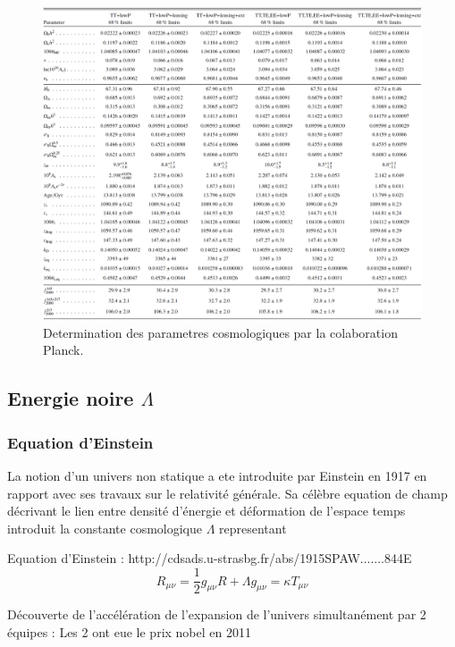 \begin{figure}[bth]
        \includegraphics[width=.95\linewidth]{img/01/table_planck.pdf} 
        \caption{Determination des parametres cosmologiques par la colaboration Planck.}
 		\label{fig:planck_parameters}
\end{figure}

\citep{planck_collaboration_planck_2016}

\subsection{Energie noire $\Lambda$}

\subsubsection{Equation d'Einstein}

La notion d'un univers non statique a ete introduite par Einstein en 1917 en rapport avec ses travaux sur le relativité générale. 
Sa célèbre equation de champ décrivant le lien entre densité d'énergie et déformation de l'espace temps introduit la constante cosmologique $\Lambda$ representant 

Equation d'Einstein :
http://cdsads.u-strasbg.fr/abs/1915SPAW.......844E
\begin{equation}
R_{\mu\nu} = \frac{1}{2} g_{\mu\nu}R + \Lambda g_{\mu\nu}  = \kappa T_{\mu\nu}
\end{equation} 



Découverte de l'accélération de l'expansion de l'univers simultanément par 2 équipes :
Les 2 ont eue le prix nobel en 2011

